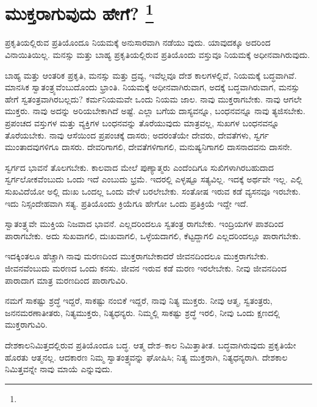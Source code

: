 
\chapter[ಮುಕ್ತರಾಗುವುದು ಹೇಗೆ? ]{ಮುಕ್ತರಾಗುವುದು ಹೇಗೆ? \protect\footnote{}}

ಪ್ರಕೃತಿಯಲ್ಲಿರುವ ಪ್ರತಿಯೊಂದೂ ನಿಯಮಕ್ಕೆ ಅನುಸಾರವಾಗಿ ನಡೆಯು ವುದು. ಯಾವುದಕ್ಕೂ ಅದರಿಂದ ವಿನಾಯಿತಿಯಿಲ್ಲ. ಮನಸ್ಸು ಮತ್ತು ಬಾಹ್ಯ ಪ್ರಕೃತಿಯಲ್ಲಿರುವ ಪ್ರತಿಯೊಂದು ವಸ್ತುವೂ ನಿಯಮಕ್ಕೆ ಅಧೀನವಾಗಿರುವುದು.

ಬಾಹ್ಯ ಮತ್ತು ಆಂತರಿಕ ಪ್ರಕೃತಿ, ಮನಸ್ಸು ಮತ್ತು ದ್ರವ್ಯ, ಇವೆಲ್ಲವೂ ದೇಶ ಕಾಲಗಳಲ್ಲಿವೆ, ನಿಯಮಕ್ಕೆ ಬದ್ಧವಾಗಿವೆ. ಮಾನಸಿಕ ಸ್ವಾತಂತ್ರ್ಯವೆಂಬುದೊಂದು ಭ್ರಾಂತಿ. ನಿಯಮಕ್ಕೆ ಅಧೀನವಾಗಿರುವಾಗ, ಅದಕ್ಕೆ ಬದ್ಧವಾಗಿರುವಾಗ, ಮನಸ್ಸು ಹೇಗೆ ಸ್ವತಂತ್ರವಾಗಿರಬಲ್ಲದು? ಕರ್ಮನಿಯಮವೇ ಒಂದು ನಿಯಮ ಜಾಲ. ನಾವು ಮುಕ್ತರಾಗಬೇಕು. ನಾವು ಆಗಲೇ ಮುಕ್ತರು. ನಾವು ಅದನ್ನು ಅರಿಯಬೇಕಾಗಿದೆ ಅಷ್ಟೆ. ಎಲ್ಲಾ ಬಗೆಯ ದಾಸ್ಯವನ್ನೂ, ಬಂಧನವನ್ನೂ ನಾವು ತ್ಯಜಿಸಬೇಕು. ಪ್ರಪಂಚದ ವಸ್ತುಗಳ ಮತ್ತು ವ್ಯಕ್ತಿಗಳ ಬಂಧನವನ್ನು ತೊರೆಯುವುದು ಮಾತ್ರವಲ್ಲ, ಸುಖಗಳ ಬಂಧನವನ್ನೂ ತೊರೆಯಬೇಕು. ನಾವು ಆಸೆಯಿಂದ ಪ್ರಪಂಚಕ್ಕೆ ದಾಸರು; ಅದರಂತೆಯೇ ದೇವರು, ದೇವತೆಗಳು, ಸ್ವರ್ಗ ಮುಂತಾದವುಗಳಿಗೂ ದಾಸರು. ದೇವರಿಗಾಗಲಿ, ದೇವತೆಗಳಿಗಾಗಲಿ, ಮನುಷ್ಯನಿಗಾಗಲಿ ದಾಸನಾದವನು ದಾಸನೇ.

ಸ್ವರ್ಗದ ಭಾವನೆ ತೊಲಗಬೇಕು. ಕಾಲವಾದ ಮೇಲೆ ಪುಣ್ಯಾತ್ಮರು ಎಂದೆಂದಿಗೂ ಸುಖಿಗಳಾಗಿರಬಹುದಾದ ಸ್ವರ್ಗಲೋಕವೆಂಬುದು ಒಂದು ಇದೆ ಎಂಬುದು ಭ್ರಮೆ. ಇದರಲ್ಲಿ ಎಳ್ಳಷ್ಟೂ ಸತ್ಯವಿಲ್ಲ. ಇದಕ್ಕೆ ಅರ್ಥವೇ ಇಲ್ಲ. ಎಲ್ಲಿ ಸುಖವಿದೆಯೋ ಅಲ್ಲಿ ದುಃಖ ಒಂದಲ್ಲ ಒಂದು ವೇಳೆ ಬರಲೇಬೇಕು. ಸಂತೋಷ ಇರುವ ಕಡೆ ವ್ಯಸನವೂ ಇರಬೇಕು. ಇದು ನಿಸ್ಸಂದೇಹವಾಗಿ ಸತ್ಯ. ಪ್ರತಿಯೊಂದು ಕ್ರಿಯೆಗೂ ಹೇಗೋ ಒಂದು ಪ್ರತಿಕ್ರಿಯೆ ಇದ್ದೇ ಇದೆ.

ಸ್ವಾತಂತ್ರ್ಯವೇ ಮುಕ್ತಿಯ ನಿಜವಾದ ಭಾವನೆ. ಎಲ್ಲದರಿಂದಲೂ ಸ್ವತಂತ್ರ ರಾಗಬೇಕು. ಇಂದ್ರಿಯಗಳ ಪಾಶದಿಂದ ಪಾರಾಗಬೇಕು. ಅದು ಸುಖವಾಗಲಿ, ದುಃಖವಾಗಲಿ, ಒಳ್ಳೆಯದಾಗಲಿ, ಕೆಟ್ಟದ್ದಾಗಲಿ ಎಲ್ಲದರಿಂದಲ್ಲೂ ಪಾರಾಗಬೇಕು.

ಇದಕ್ಕಿಂತಲೂ ಹೆಚ್ಚಾಗಿ ನಾವು ಮರಣದಿಂದ ಮುಕ್ತರಾಗಬೇಕಾದರೆ ಜೀವನದಿಂದಲೂ ಮುಕ್ತರಾಗಬೇಕು. ಜೀವನವೆಂಬುದು ಮರಣದ ಒಂದು ಕನಸು. ಜೀವನ ಇರುವ ಕಡೆ ಮರಣ ಇರಲೇಬೇಕು. ನೀವು ಜೀವನದಿಂದ ಪಾರಾದಾಗ ಮಾತ್ರ ಮರಣದಿಂದ ಪಾರಾಗುವಿರಿ.

ನಮಗೆ ಸಾಕಷ್ಟು ಶ್ರದ್ಧೆ ಇದ್ದರೆ, ಸಾಕಷ್ಟು ನಂಬಿಕೆ ಇದ್ದರೆ, ನಾವು ನಿತ್ಯ ಮುಕ್ತರು. ನೀವು ಆತ್ಮ, ಸ್ವತಂತ್ರರು, ಜನನಮರಣಾತೀತರು, ನಿತ್ಯಮುಕ್ತರು, ನಿತ್ಯಧನ್ಯರು. ನಿಮ್ಮಲ್ಲಿ ಸಾಕಷ್ಟು ಶ್ರದ್ಧೆ ಇರಲಿ, ನೀವು ಒಂದು ಕ್ಷಣದಲ್ಲಿ ಮುಕ್ತರಾಗುವಿರಿ.

ದೇಶಕಾಲನಿಮಿತ್ತದಲ್ಲಿರುವ ಪ್ರತಿಯೊಂದೂ ಬದ್ಧ. ಆತ್ಮ ದೇಶ–ಕಾಲ ನಿಮಿತ್ತಾತೀತ. ಬದ್ಧವಾಗಿರುವುದು ಪ್ರಕೃತಿಯೇ ಹೊರತು ಆತ್ಮನಲ್ಲ. ಆದಕಾರಣ ನಿಮ್ಮ ಸ್ವಾತಂತ್ರ್ಯವನ್ನು ಘೋಷಿಸಿ; ನಿತ್ಯ ಮುಕ್ತರಾಗಿ, ನಿತ್ಯಧನ್ಯರಾಗಿ. ದೇಶಕಾಲ ನಿಮಿತ್ತವನ್ನೇ ನಾವು ಮಾಯೆ ಎನ್ನುವುದು.

